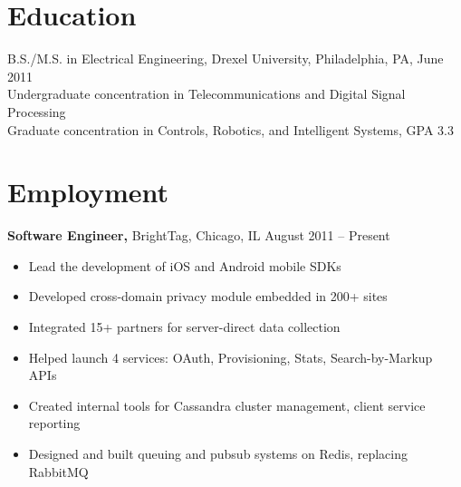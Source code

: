 \documentclass[margin]{res}
\begin{document}
 
 
 
\address{{\bf Present Address} \\ 4157 N Clarendon Ave \#404 \\ Chicago, IL 60613  \\
        (215) 501-7891 }
\address{{\bf Permanent Address} \\ 1726 Reyburn Creek Road \\ Malvern, AR 72104 \\
        (501) 337-8485 }

\begin{resume} 


\section{Education} 
B.S./M.S. in Electrical Engineering, Drexel University, Philadelphia, PA, June 2011 \\
Undergraduate concentration in Telecommunications and Digital Signal Processing \\
Graduate concentration in Controls, Robotics, and Intelligent Systems, GPA 3.3 

\section{Employment}
 {\bf Software Engineer,} BrightTag, Chicago, IL \hfill August 2011 -- Present
 \begin{itemize} \itemsep -2pt  %
  \item Lead the development of iOS and Android mobile SDKs
  \item Developed cross-domain privacy module embedded in 200+ sites
  \item Integrated 15+ partners for server-direct data collection
  \item Helped launch 4 services: OAuth, Provisioning, Stats, Search-by-Markup APIs
  \item Created internal tools for Cassandra cluster management, client service reporting
  \item Designed and built queuing and pubsub systems on Redis, replacing RabbitMQ
 \end{itemize}


\end{resume}
\end{document}
